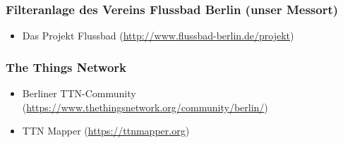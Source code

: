 \subsubsection*{Filteranlage des Vereins Flussbad Berlin (unser Messort)}
\begin{itemize}[noitemsep]
	\item Das Projekt Flussbad (\url{http://www.flussbad-berlin.de/projekt})
\end{itemize}

\subsubsection*{The Things Network}
\begin{itemize}[noitemsep]
	\item Berliner TTN-Community (\url{https://www.thethingsnetwork.org/community/berlin/})
	\item TTN Mapper (\url{https://ttnmapper.org})
\end{itemize}

\newpage
